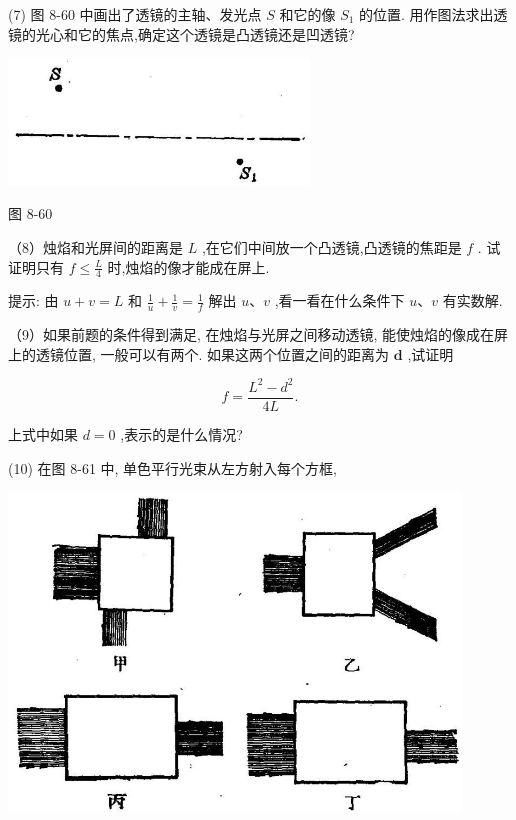 \documentclass[10pt]{article}
\begin{document}
(7) 图 8-60 中画出了透镜的主轴、发光点 \(S\) 和它的像 \({S}_{1}\) 的位置. 用作图法求出透镜的光心和它的焦点,确定这个透镜是凸透镜还是凹透镜?

\begin{center}
\includegraphics[max width=0.6\textwidth]{images/01913056-1f15-74d8-9184-9aab52c9d66b_294_589137.jpg}
\end{center}

图 8-60

（8）烛焰和光屏间的距离是 \(L\) ,在它们中间放一个凸透镜,凸透镜的焦距是 \(f\) . 试证明只有 \(f \leq \frac{L}{4}\) 时,烛焰的像才能成在屏上.

提示: 由 \(u + v = L\) 和 \(\frac{1}{u} + \frac{1}{v} = \frac{1}{f}\) 解出 \(u\text{、}v\) ,看一看在什么条件下 \(u\text{、}v\) 有实数解.

（9）如果前题的条件得到满足, 在烛焰与光屏之间移动透镜, 能使烛焰的像成在屏上的透镜位置, 一般可以有两个. 如果这两个位置之间的距离为 \(\mathbf{d}\) ,试证明

\[
f = \frac{{L}^{2} - {d}^{2}}{4L}.
\]

上式中如果 \(d = 0\) ,表示的是什么情况?

(10) 在图 8-61 中, 单色平行光束从左方射入每个方框,

\begin{center}
\includegraphics[max width=0.9\textwidth]{images/01913056-1f15-74d8-9184-9aab52c9d66b_295_201966.jpg}
\end{center}
\end{document}

